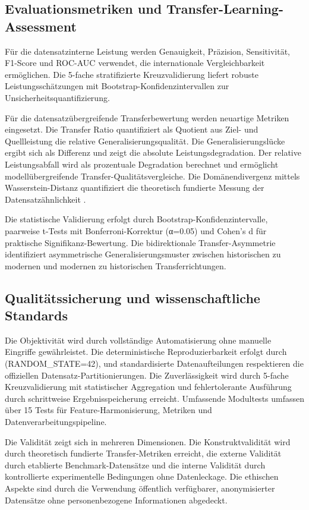 \documentclass[11pt,a4paper]{article}
\begin{document}
    \subsection{Evaluationsmetriken und Transfer-Learning-Assessment}

    Für die datensatzinterne Leistung werden Genauigkeit, Präzision, Sensitivität, F1-Score und ROC-AUC verwendet, die internationale Vergleichbarkeit ermöglichen. Die 5-fache stratifizierte Kreuzvalidierung liefert robuste Leistungsschätzungen mit Bootstrap-Konfidenzintervallen zur Unsicherheitsquantifizierung.

    Für die datensatzübergreifende Transferbewertung werden neuartige Metriken eingesetzt. Die Transfer Ratio quantifiziert als Quotient aus Ziel- und Quellleistung die relative Generalisierungsqualität. Die Generalisierungslücke ergibt sich als Differenz und zeigt die absolute Leistungsdegradation. Der relative Leistungsabfall wird als prozentuale Degradation berechnet und ermöglicht modellübergreifende Transfer-Qualitätsvergleiche. Die Domänendivergenz mittels Wasserstein-Distanz quantifiziert die theoretisch fundierte Messung der Datensatzähnlichkeit \parencite{Mourouzis2021}.

    Die statistische Validierung erfolgt durch Bootstrap-Konfidenzintervalle, paarweise t-Tests mit Bonferroni-Korrektur (α=0.05) und Cohen's d für praktische Signifikanz-Bewertung. Die bidirektionale Transfer-Asymmetrie identifiziert asymmetrische Generalisierungsmuster zwischen historischen zu modernen und modernen zu historischen Transferrichtungen.

    \subsection{Qualitätssicherung und wissenschaftliche Standards}

    Die Objektivität wird durch vollständige Automatisierung ohne manuelle Eingriffe gewährleistet. Die deterministische Reproduzierbarkeit erfolgt durch (RANDOM\_STATE=42), und standardisierte Datenaufteilungen respektieren die offiziellen Datensatz-Partitionierungen. Die Zuverlässigkeit wird durch 5-fache Kreuzvalidierung mit statistischer Aggregation und fehlertolerante Ausführung durch schrittweise Ergebnisspeicherung erreicht. Umfassende Modultests umfassen über 15 Tests für Feature-Harmonisierung, Metriken und Datenverarbeitungspipeline.

    Die Validität zeigt sich in mehreren Dimensionen. Die Konstruktvalidität wird durch theoretisch fundierte Transfer-Metriken erreicht, die externe Validität durch etablierte Benchmark-Datensätze und die interne Validität durch kontrollierte experimentelle Bedingungen ohne Datenleckage. Die ethischen Aspekte sind durch die Verwendung öffentlich verfügbarer, anonymisierter Datensätze ohne personenbezogene Informationen abgedeckt.
\end{document}
